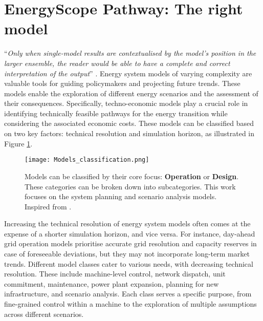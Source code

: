 \section{EnergyScope Pathway: The right model} 
\label{app:ESPathway_choice}

``\textit{Only when single-model results are contextualised by the model's position in the larger ensemble, the reader would be able to have a complete and correct interpretation of the output}'' \cite{dekker2023identifying}. Energy system models of varying complexity are valuable tools for guiding policymakers and projecting future trends. These models enable the exploration of different energy scenarios and the assessment of their consequences. Specifically, techno-economic models play a crucial role in identifying technically feasible pathways for the energy transition while considering the associated economic costs. These models can be classified based on two key factors: technical resolution and simulation horizon, as illustrated in Figure \ref{fig:energy_models_classification}.


\begin{figure}[!htbp]
\centering
\texttt{[image: Models\_classification.png]}
\caption{Models can be classified by their core focus: \textbf{Operation} or \textbf{Design}. These categories can be broken down into subcategories. This work focuses on the system planning and scenario analysis models. Inspired from \cite{palmintier2013incorporating}. }
\label{fig:energy_models_classification}
\end{figure}


Increasing the technical resolution of energy system models often comes at the expense of a shorter simulation horizon, and vice versa. For instance, day-ahead grid operation models prioritise accurate grid resolution and capacity reserves in case of foreseeable deviations, but they may not incorporate long-term market trends. Different model classes cater to various needs, with decreasing technical resolution. These include machine-level control, network dispatch, unit commitment, maintenance, power plant expansion, planning for new infrastructure, and scenario analysis. Each class serves a specific purpose, from fine-grained control within a machine to the exploration of multiple assumptions across different scenarios.


